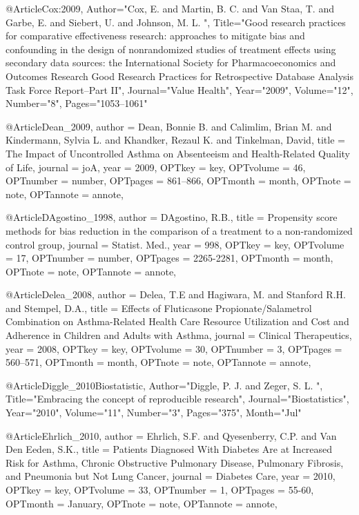 {{@Article{Cox:2009,
   Author="Cox, E.  and Martin, B. C.  and Van Staa, T.  and Garbe, E.  and Siebert, U.  and Johnson, M. L. ",
   Title="{{G}ood research practices for comparative effectiveness research: approaches to mitigate bias and confounding in the design of nonrandomized studies of treatment effects using secondary data sources: the {I}nternational {S}ociety for {P}harmacoeconomics and {O}utcomes {R}esearch {G}ood {R}esearch {P}ractices for {R}etrospective {D}atabase {A}nalysis {T}ask {F}orce {R}eport--{P}art {I}{I}}",
   Journal="Value Health",
   Year="2009",
   Volume="12",
   Number="8",
   Pages="1053--1061"
}


@Article{Dean_2009,
author = {Dean, Bonnie B. and Calimlim, Brian M. and Kindermann, Sylvia L. and Khandker, Rezaul K. and Tinkelman, David},
title = {The Impact of Uncontrolled Asthma on Absenteeism and Health-Related
Quality of Life},
journal = {joA},
year = {2009},
OPTkey = {key},
OPTvolume = {46},
OPTnumber = {number},
OPTpages = {861–866},
OPTmonth = {month},
OPTnote = {note},
OPTannote = {annote},
}

@Article{DAgostino_1998,
author = {DAgostino, R.B.},
title = {Propensity score methods for bias reduction in the comparison of a treatment to a non-randomized control group},
journal = {Statist. Med.},
year = {998},
OPTkey = {key},
OPTvolume = {17},
OPTnumber = {number},
OPTpages = {2265-2281},
OPTmonth = {month},
OPTnote = {note},
OPTannote = {annote},
}

@Article{Delea_2008,
author = {Delea, T.E and Hagiwara, M. and Stanford R.H. and Stempel, D.A.},
title = {Effects of Fluticasone Propionate/Salametrol Combination on Asthma-Related Health Care Resource Utilization and Cost and Adherence in Children and Adults with Asthma},
journal = {Clinical Therapeutics},
year = {2008},
OPTkey = {key},
OPTvolume = {30},
OPTnumber = {3},
OPTpages = {560–571},
OPTmonth = {month},
OPTnote = {note},
OPTannote = {annote},
}


@Article{Diggle_2010Biostatistic,
   Author="Diggle, P. J.  and Zeger, S. L. ",
   Title="{{E}mbracing the concept of reproducible research}",
   Journal="Biostatistics",
   Year="2010",
   Volume="11",
   Number="3",
   Pages="375",
   Month="Jul"
}

@Article{Ehrlich_2010,
author = {Ehrlich, S.F. and Qyesenberry, C.P. and Van Den Eeden, S.K.},
title = {Patients Diagnosed With Diabetes Are at Increased Risk for Asthma, Chronic Obstructive Pulmonary Disease, Pulmonary Fibrosis, and Pneumonia but Not Lung Cancer},
journal = {Diabetes Care},
year = {2010},
OPTkey = {key},
OPTvolume = {33},
OPTnumber = {1},
OPTpages = {55-60},
OPTmonth = {January},
OPTnote = {note},
OPTannote = {annote},
}


}}
